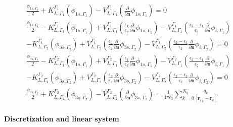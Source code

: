 \begin{align} \label{eq:integral_eq_lspr_system}
\frac{\phi_{1s,\Gamma_1}}{2}+ K_{L,\Gamma_1}^{\Gamma_1}(\phi_{1s,\Gamma_1}) - V_{L,\Gamma_1}^{\Gamma_1} \left(\frac{\partial}{\partial \mathbf{n}}\phi_{1s,\Gamma_1} \right) = 0 & \nonumber \\
\frac{\phi_{1s,\Gamma_1}}{2} - K_{L,\Gamma_1}^{\Gamma_1}(\phi_{1s,\Gamma_1}) + V_{L,\Gamma_1}^{\Gamma_1} \left(\frac{\epsilon_1}{\epsilon_2}\frac{\partial}{\partial \mathbf{n}}\phi_{1s,\Gamma_1} \right) - V_{L,\Gamma_1}^{\Gamma_1} \left(\frac{\epsilon_2-\epsilon_1}{\epsilon_2}\frac{\partial}{\partial \mathbf{n}}\phi_{i,\Gamma_1} \right) & \nonumber\\
 - K_{L,\Gamma_2}^{\Gamma_1}(\phi_{3s,\Gamma_2}) + V_{L,\Gamma_2}^{\Gamma_1} \left(\frac{\epsilon_3}{\epsilon_2}\frac{\partial}{\partial \mathbf{n}}\phi_{3s,\Gamma_2} \right)  - V_{L,\Gamma_2}^{\Gamma_1} \left(\frac{\epsilon_2 -\epsilon_3}{\epsilon_2}\frac{\partial}{\partial \mathbf{n}}\phi_{i,\Gamma_2} \right) = 0 &  \nonumber \\
\frac{\phi_{3s,\Gamma_1}}{2} - K_{L,\Gamma_1}^{\Gamma_2}(\phi_{1s,\Gamma_1}) + V_{L,\Gamma_1}^{\Gamma_2} \left(\frac{\epsilon_1}{\epsilon_2}\frac{\partial}{\partial \mathbf{n}}\phi_{1s,\Gamma_1} \right) - V_{L,\Gamma_1}^{\Gamma_2} \left(\frac{\epsilon_2-\epsilon_1}{\epsilon_2}\frac{\partial}{\partial \mathbf{n}}\phi_{i,\Gamma_1} \right) & \nonumber\\
 - K_{L,\Gamma_2}^{\Gamma_2}(\phi_{3s,\Gamma_2}) + V_{L,\Gamma_2}^{\Gamma_2} \left(\frac{\epsilon_3}{\epsilon_2}\frac{\partial}{\partial \mathbf{n}}\phi_{3s,\Gamma_2} \right)  - V_{L,\Gamma_2}^{\Gamma_2} \left(\frac{\epsilon_2 -\epsilon_3}{\epsilon_2}\frac{\partial}{\partial \mathbf{n}}\phi_{i,\Gamma_2} \right) = 0 &  \nonumber \\
\frac{\phi_{3s,\Gamma_2}}{2} + K_{L,\Gamma_2}^{\Gamma_2}(\phi_{3s,\Gamma_2}) - V_{L,\Gamma_2}^{\Gamma_2} \left( \frac{\partial}{\partial \mathbf{n}} \phi_{3s,\Gamma_2} \right) = \frac{1}{4\pi\epsilon_3} \sum_{k=0}^{N_q} \frac{q_k}{|\mathbf{r}_{\Gamma_2} - \mathbf{r}_k|} &
\end{align}


\paragraph{Discretization and linear system}

